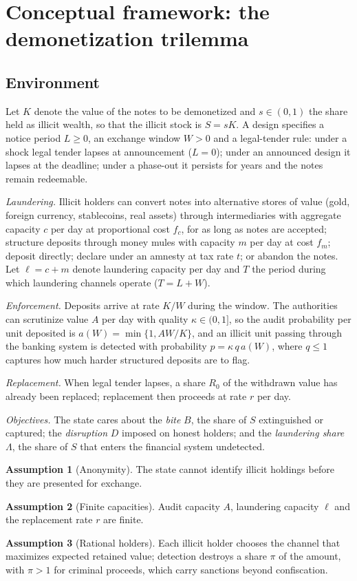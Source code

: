 \documentclass[11pt]{article}
\theoremstyle{definition}
\newtheorem{assumption}{Assumption}
\theoremstyle{remark}
\begin{document}
\section{Conceptual framework: the demonetization trilemma}\label{sec:framework}

\subsection{Environment}
Let $K$ denote the value of the notes to be demonetized and $s\in(0,1)$ the share held as illicit wealth, so that the
illicit stock is $S=sK$. A design specifies a notice period $L\ge 0$, an exchange window $W>0$ and a legal-tender rule:
under a shock legal tender lapses at announcement ($L=0$); under an announced design it lapses at the deadline; under a
phase-out it persists for years and the notes remain redeemable.

\textit{Laundering.} Illicit holders can convert notes into alternative stores of value (gold, foreign currency,
stablecoins, real assets) through intermediaries with aggregate capacity $c$ per day at proportional cost $f_c$, for as
long as notes are accepted; structure deposits through money mules with capacity $m$ per day at cost $f_m$; deposit
directly; declare under an amnesty at tax rate $t$; or abandon the notes. Let $\ell=c+m$ denote laundering capacity per day
and $T$ the period during which laundering channels operate ($T=L+W$).

\textit{Enforcement.} Deposits arrive at rate $K/W$ during the window. The authorities can scrutinize value $A$ per day
with quality $\kappa\in(0,1]$, so the audit probability per unit deposited is $a(W)=\min\{1,AW/K\}$, and an illicit unit
passing through the banking system is detected with probability $p=\kappa\,q\,a(W)$, where $q\le 1$ captures how much
harder structured deposits are to flag.

\textit{Replacement.} When legal tender lapses, a share $R_0$ of the withdrawn value has already been replaced;
replacement then proceeds at rate $r$ per day.

\textit{Objectives.} The state cares about the \textit{bite} $B$, the share of $S$ extinguished or captured; the
\textit{disruption} $D$ imposed on honest holders; and the \textit{laundering share} $\Lambda$, the share of $S$ that
enters the financial system undetected.

\begin{assumption}[Anonymity]\label{ass:anon} The state cannot identify illicit holdings before they are presented for
exchange.\end{assumption}
\begin{assumption}[Finite capacities]\label{ass:cap} Audit capacity $A$, laundering capacity $\ell$ and the replacement
rate $r$ are finite.\end{assumption}
\begin{assumption}[Rational holders]\label{ass:rat} Each illicit holder chooses the channel that maximizes expected
retained value; detection destroys a share $\pi$ of the amount, with $\pi>1$ for criminal proceeds, which carry sanctions
beyond confiscation.\end{assumption}
\end{document}
